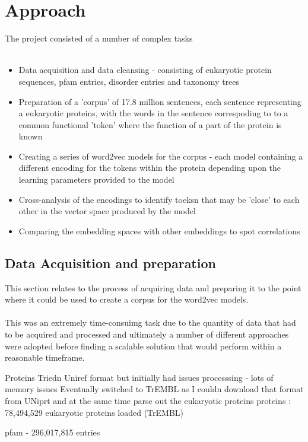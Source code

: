\documentclass{article}
\begin{document}
\section{Approach}
The project consisted of a number of complex tasks
\\\\
\begin{itemize}
    \item Data acquisition and data cleansing - consisting of eukaryotic protein sequences, pfam entries, disorder entries and taxonomy trees
    \item Preparation of a 'corpus' of 17.8 million sentences, each sentence representing a eukaryotic proteins, with the words in the sentence correspoding to to a common functional 'token' where the function of a part of the protein is known 
    \item Creating a series of word2vec models for the corpus - each model containing a different encoding for the tokens within the protein depending upon the learning parameters provided to the model
    \item Cross-analysis of the encodings to identify toeksn that may be 'close' to each other in the vector space produced by the model
    \item Comparing the embedding spaces with other embeddings to spot correlations
\end{itemize}

\subsection{Data Acquisition and preparation}
This section relates to the process of acquiring data and preparing it to the point where it could be used to create a corpus for the word2vec models. 
\\\\
This was an extremely time-consuimg task due to the quantity of data that had to be acquired and processed and ultimately a number of different approaches were adopted before finding a scalable solution that would perform within a reasonable timeframe.

Proteins
Triedn Uniref format but initially had issues processsing - lots of memory issues
Eventually switched to TrEMBL as I couldn download that format from UNiprt and at the same time parse out the eukaryotic proteins
proteins : 78,494,529 eukaryotic proteins loaded (TrEMBL)

pfam - 296,017,815 entries
\end{document}
